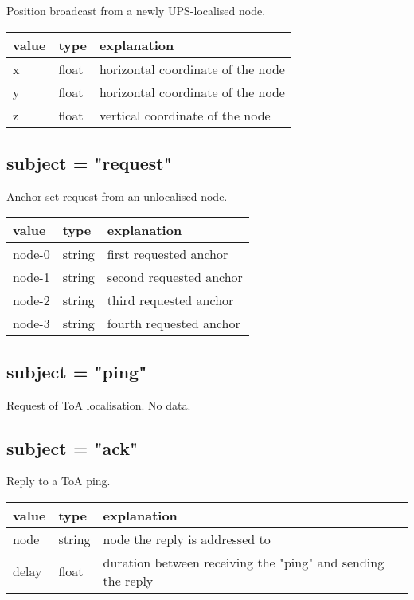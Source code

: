 \documentclass[12pt,a4paper,fleqn]{report}
\begin{document}
\begin{appendices}
Position broadcast from a newly UPS-localised node.

\begin{tabular}{|p{2cm}|p{2cm}|p{10cm}|}
	\hline
	\textbf{value} & \textbf{type} & \textbf{explanation} \\
	\hline
	x		& float		&
	horizontal coordinate of the node \\
	\hline
	y		& float		&
	horizontal coordinate of the node \\
	\hline
	z		& float		&
	vertical coordinate of the node \\
	\hline
\end{tabular}

\subsection*{subject = "request"}

Anchor set request from an unlocalised node.

\begin{tabular}{|p{2cm}|p{2cm}|p{10cm}|}
	\hline
	\textbf{value} & \textbf{type} & \textbf{explanation} \\
	\hline
	node-0		& string		&
	first requested anchor \\
	\hline
	node-1		& string		&
	second requested anchor \\
	\hline
	node-2		& string		&
	third requested anchor \\
	\hline
	node-3		& string		&
	fourth requested anchor \\
	\hline
\end{tabular}

\subsection*{subject = "ping"}

Request of ToA localisation. No data.

\subsection*{subject = "ack"}

Reply to a ToA ping.

\begin{tabular}{|p{2cm}|p{2cm}|p{10cm}|}
	\hline
	\textbf{value} & \textbf{type} & \textbf{explanation} \\
	\hline
	node		& string		&
	node the reply is addressed to \\
	\hline
	delay		& float		&
	duration between receiving the "ping" and sending the reply \\
	\hline
\end{tabular}


\end{appendices}
\end{document}

